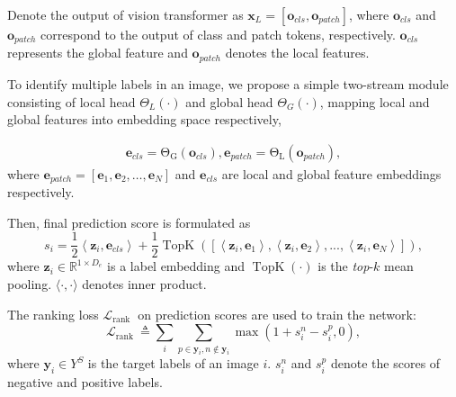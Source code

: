 \documentclass[letterpaper]{article} %
\begin{document}
Denote the output of vision transformer as $\mathbf{x}_{L}= \left[\mathbf{o}_{cls}, \mathbf{o}_{patch}\right]$, where $\mathbf{o}_{cls}$ and $\mathbf{o}_{patch}$ correspond to the output of class and patch tokens, respectively. 
$\mathbf{o}_{cls}$ represents the global feature and $\mathbf{o}_{patch}$ denotes the local features.
\par
To identify multiple labels in an image, we propose a simple two-stream module consisting of local head $\Theta_{L}\left(\cdot\right)$ and global head $\Theta_{G}\left(\cdot\right)$, mapping local and global features into embedding space respectively, \par
\begin{equation}
\begin{aligned}
\mathbf{e}_{cls}=\operatorname{\Theta_{G}}\left(\mathbf{o}_{cls}\right), \mathbf{e}_{patch}=\operatorname{\Theta_{L}}\left(\mathbf{o}_{patch}\right), 
\end{aligned}
\end{equation}
where $\mathbf{e}_{patch}= [\mathbf{e}_{1}, \mathbf{e}_{2}, \dots, \mathbf{e}_{N}]$ and $\mathbf{e}_{cls}$ are local and global feature embeddings respectively. \par
Then, final prediction score is formulated as
\begin{equation}
s_{i}=\frac{1}{2}\left\langle\mathbf{z}_{i}, \mathbf{e}_{cls}\right\rangle + \frac{1}{2}\operatorname{TopK}\left(\left[\left\langle\mathbf{z}_{i}, \mathbf{e}_{1}\right\rangle,
\left\langle\mathbf{z}_{i}, \mathbf{e}_{2}\right\rangle,
...,
\left\langle\mathbf{z}_{i}, \mathbf{e}_{N}\right\rangle
\right]\right), 
\label{eq:logit}
\end{equation}
where $\mathbf{z}_{i} \in \mathbb{R}^{1 \times D_{e}}$ is a label embedding and $\operatorname{TopK} \left(\cdot\right)$ is the \textit{top}-$k$ mean pooling. $\langle\cdot, \cdot\rangle$ denotes inner product. \par
The ranking loss $\mathcal{L}_{\text {rank }}$ on prediction scores are used to train the network:
\begin{equation}
\mathcal{L}_{\text {rank }} \triangleq \sum_{i} \sum_{p \in \mathbf{y}_{i} , n \notin \mathbf{y}_{i}} \max \left(1+s_{i}^{n}-s_{i}^{p}, 0\right),
\end{equation}
where $\mathbf{y}_{i} \in Y^{S}$ is the target labels of an image $i$. $s_{i}^{n}$ and $s_{i}^{p}$ denote the scores of negative and positive labels.
\end{document}
